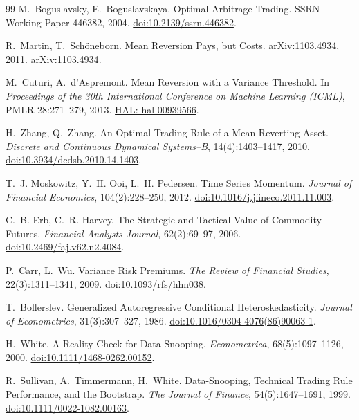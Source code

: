 \begin{thebibliography}{99}
 M.~Boguslavsky, E.~Boguslavskaya. Optimal Arbitrage Trading. SSRN Working Paper 446382, 2004. \href{https://doi.org/10.2139/ssrn.446382}{doi:10.2139/ssrn.446382}.

 R.~Martin, T.~Sch\"oneborn. Mean Reversion Pays, but Costs. arXiv:1103.4934, 2011. \href{https://arxiv.org/abs/1103.4934}{arXiv:1103.4934}.

 M.~Cuturi, A.~d'Aspremont. Mean Reversion with a Variance Threshold. In \emph{Proceedings of the 30th International Conference on Machine Learning (ICML)}, PMLR 28:271--279, 2013. \href{https://hal.science/hal-00939566}{HAL: hal-00939566}.

 H.~Zhang, Q.~Zhang. An Optimal Trading Rule of a Mean-Reverting Asset. \emph{Discrete and Continuous Dynamical Systems--B}, 14(4):1403--1417, 2010. \href{https://doi.org/10.3934/dcdsb.2010.14.1403}{doi:10.3934/dcdsb.2010.14.1403}.

 T.~J. Moskowitz, Y.~H. Ooi, L.~H. Pedersen. Time Series Momentum. \emph{Journal of Financial Economics}, 104(2):228--250, 2012. \href{https://doi.org/10.1016/j.jfineco.2011.11.003}{doi:10.1016/j.jfineco.2011.11.003}.

 C.~B. Erb, C.~R. Harvey. The Strategic and Tactical Value of Commodity Futures. \emph{Financial Analysts Journal}, 62(2):69--97, 2006. \href{https://doi.org/10.2469/faj.v62.n2.4084}{doi:10.2469/faj.v62.n2.4084}.

 P.~Carr, L.~Wu. Variance Risk Premiums. \emph{The Review of Financial Studies}, 22(3):1311--1341, 2009. \href{https://doi.org/10.1093/rfs/hhn038}{doi:10.1093/rfs/hhn038}.

 T.~Bollerslev. Generalized Autoregressive Conditional Heteroskedasticity. \emph{Journal of Econometrics}, 31(3):307--327, 1986. \href{https://doi.org/10.1016/0304-4076(86)90063-1}{doi:10.1016/0304-4076(86)90063-1}.

 H.~White. A Reality Check for Data Snooping. \emph{Econometrica}, 68(5):1097--1126, 2000. \href{https://doi.org/10.1111/1468-0262.00152}{doi:10.1111/1468-0262.00152}.

 R.~Sullivan, A.~Timmermann, H.~White. Data-Snooping, Technical Trading Rule Performance, and the Bootstrap. \emph{The Journal of Finance}, 54(5):1647--1691, 1999. \href{https://doi.org/10.1111/0022-1082.00163}{doi:10.1111/0022-1082.00163}.


\end{thebibliography}
